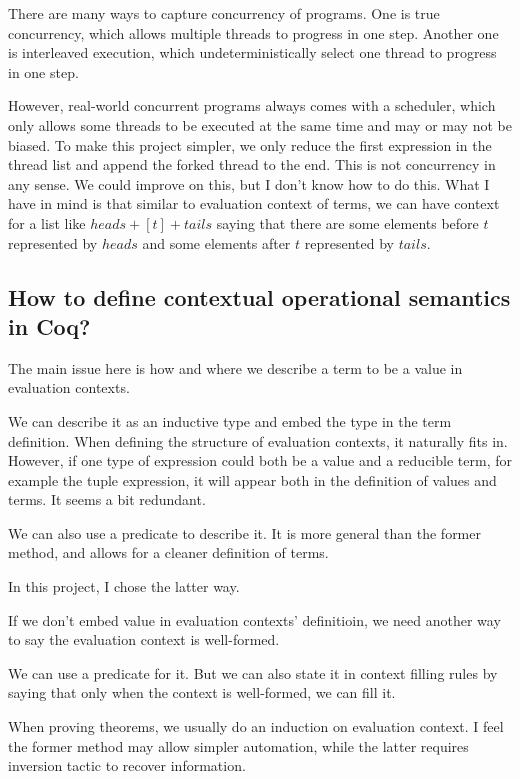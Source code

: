 \documentclass{article}
\newcommand{\sco}[1]{\textsf{#1}}
\begin{document}
There are many ways to capture concurrency of programs. One is true concurrency, which allows multiple
threads to progress in one step. Another one is interleaved execution, which undeterministically select
one thread to progress in one step.

However, real-world concurrent programs always comes with a scheduler, which only allows some threads to
be executed at the same time and may or may not be biased. To make this project simpler, we only reduce the
first expression in the thread list and append the forked thread to the end. This is not concurrency in any
sense. We could improve on this, but I don't know how to do this. What I have in mind is that similar to
evaluation context of terms, we can have context for a list like $heads + [t] + tails$ saying that there are
some elements before $t$ represented by $heads$ and some elements after $t$ represented by $tails$.

\subsection{How to define contextual operational semantics in Coq?}

The main issue here is how and where we describe a term to be a value in evaluation contexts.

We can describe it as an inductive type and embed the type in the term definition.
When defining the structure of evaluation contexts, it naturally fits in. However, if one type of
expression could both be a value and a reducible term, for example the tuple expression, it will appear
both in the definition of values and terms. It seems a bit redundant.

We can also use a predicate to describe it. It is more general than the former method, and allows for
a cleaner definition of terms.

In this project, I chose the latter way.

If we don't embed value in evaluation contexts' definitioin, we need another way to say the evaluation context
is well-formed.

We can use a predicate for it. But we can also state it in context filling rules by saying that only
when the context is well-formed, we can fill it.

When proving theorems, we usually do an induction on evaluation context. I feel the former method may allow simpler
automation, while the latter requires \sco{inversion} tactic to recover information.
\end{document}
